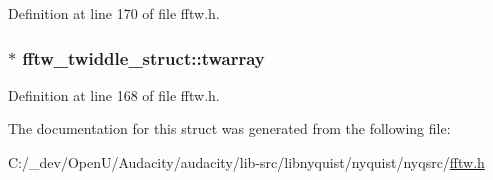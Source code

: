 Definition at line 170 of file fftw.\+h.

\subsubsection[{\texorpdfstring{twarray}{twarray}}]{$\ast$ fftw\+\_\+twiddle\+\_\+struct\+::twarray}\hypertarget{structfftw__twiddle__struct_ac9d49fa830d0e0e59de456bb4a614fe4}{}\label{structfftw__twiddle__struct_ac9d49fa830d0e0e59de456bb4a614fe4}


Definition at line 168 of file fftw.\+h.



The documentation for this struct was generated from the following file\+:\begin{DoxyCompactItemize}
\item 
C\+:/\+\_\+dev/\+Open\+U/\+Audacity/audacity/lib-\/src/libnyquist/nyquist/nyqsrc/\hyperlink{fftw_8h}{fftw.\+h}\end{DoxyCompactItemize}
